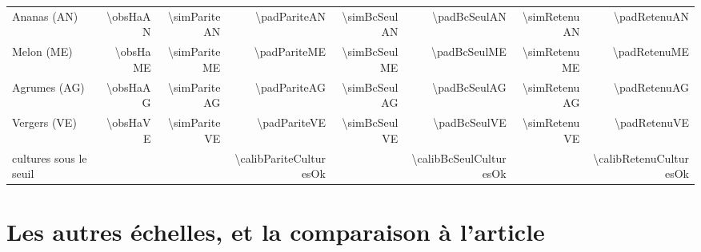 \begin{table}[H]
\begin{tabular}{@{}lrrrrrrr@{}}
    Ananas (AN) & \num{\obsHaAN} & \num{\simPariteAN} & \num{\padPariteAN}
      & \num{\simBcSeulAN} & \num{\padBcSeulAN} & \num{\simRetenuAN} & \num{\padRetenuAN} \\
    Melon (ME) & \num{\obsHaME} & \num{\simPariteME} & \num{\padPariteME}
      & \num{\simBcSeulME} & \num{\padBcSeulME} & \num{\simRetenuME} & \num{\padRetenuME} \\
    Agrumes (AG) & \num{\obsHaAG} & \num{\simPariteAG} & \num{\padPariteAG}
      & \num{\simBcSeulAG} & \num{\padBcSeulAG} & \num{\simRetenuAG} & \num{\padRetenuAG} \\
    Vergers (VE) & \num{\obsHaVE} & \num{\simPariteVE} & \num{\padPariteVE}
      & \num{\simBcSeulVE} & \num{\padBcSeulVE} & \num{\simRetenuVE} & \num{\padRetenuVE} \\
    \midrule
    cultures sous le seuil & & & \num{\calibPariteCulturesOk}
      & & \num{\calibBcSeulCulturesOk} & & \num{\calibRetenuCulturesOk} \\
    \bottomrule
  \end{tabular}
\end{table}

\section{Les autres échelles, et la comparaison à l'article}

